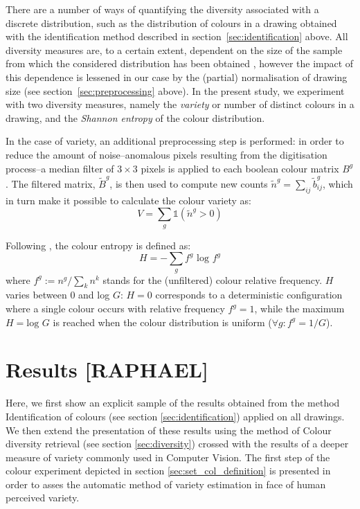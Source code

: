 \documentclass[11pt,a4paper]{article}
\begin{document}
There are a number of ways of quantifying the diversity associated with a discrete distribution, such as the distribution of colours in a drawing obtained with the identification method described in section~\ref{sec:identification} above. All diversity measures are, to a certain extent, dependent on the size of the sample from which the considered distribution has been obtained \cite[see e.g.][]{TweedieBaayen1998}, however the impact of this dependence is lessened in our case by the (partial) normalisation of drawing size (see section~\ref{sec:preprocessing} above). In the present study, we experiment with two diversity measures, namely the {\em variety} or number of distinct colours in a drawing, and the {\em Shannon entropy} of the colour distribution.

In the case of variety, an additional preprocessing step is performed: in order to reduce the amount of noise--anomalous pixels resulting from the digitisation process--a median filter of \(3 \times 3\) pixels is applied to each boolean colour matrix $B^{g}$. The filtered matrix, $\tilde{B}^{g}$, is then used to compute new counts $\tilde{n}^{g} = \sum_{ij}\tilde{b}_{ij}^{g}$, which in turn make it possible to calculate the colour variety as:
\begin{equation}
	V = \sum_{g}\mathds{1}(\tilde{n}^{g} > 0)
\end{equation}

Following \citet{Shannon1948}, the colour entropy is defined as:
\begin{equation}
	H = -\sum_{g} f^{g}\mbox{ log }f^{g}
\end{equation}
where $f^{g}:= n^{g}/\sum_{k}n^{k}$ stands for the (unfiltered) colour relative frequency. $H$ varies between 0 and log $G$: $H=0$ corresponds to a deterministic configuration where a single colour occurs with relative frequency $f^{g} = 1$, while the maximum $H=\mbox{log }G$ is reached when the colour distribution is uniform ($\forall g: f^{g} = 1/G$).



\section{Results [RAPHAEL]}
\label{sec:results}
Here, we first show an explicit sample of the results obtained from the method Identification of colours (see section \ref{sec:identification}) applied on all drawings. 
We then extend the presentation of these results using the method of Colour diversity retrieval (see section \ref{sec:diversity}) crossed with the results of a deeper measure of variety commonly used in Computer Vision. 
The first step of the colour experiment depicted in section \ref{sec:set_col_definition} is presented in order to asses the automatic method of variety estimation in face of human perceived variety.
\end{document}
